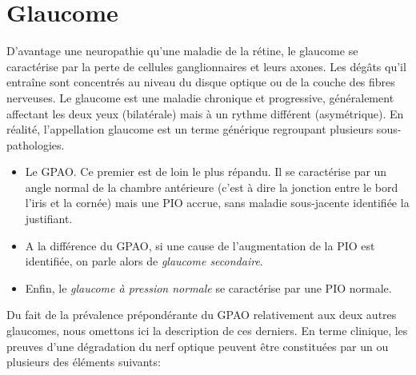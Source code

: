 \section{Glaucome}
\label{sec:glaucome}
D'avantage une neuropathie qu'une maladie de la rétine, le glaucome se caractérise par la perte de cellules ganglionnaires et leurs axones. Les dégâts qu'il entraîne sont concentrés au niveau du disque optique ou de la couche des fibres nerveuses. Le glaucome est une maladie chronique et progressive, généralement affectant les deux yeux (bilatérale) mais à un rythme différent (asymétrique). En réalité, l'appellation glaucome est un terme générique regroupant plusieurs sous-pathologies.
\begin{itemize}
	\item Le \ac{GPAO}. Ce premier est de loin le plus répandu. Il se caractérise par un angle normal de la chambre antérieure (c'est à dire la jonction entre le bord l'iris et la cornée) mais une \ac{PIO} accrue, sans maladie sous-jacente identifiée la justifiant.
	\item A la différence du GPAO, si une cause de l'augmentation de la \ac{PIO} est identifiée, on parle alors de \textit{glaucome secondaire}.
	\item Enfin, le \textit{glaucome à pression normale} se caractérise par une \ac{PIO} normale.
\end{itemize}
Du fait de la prévalence prépondérante du \ac{GPAO} relativement aux deux autres glaucomes, nous omettons ici la description de ces derniers.
En terme clinique, les preuves d'une dégradation du nerf optique peuvent être constituées par un ou plusieurs des éléments suivants:
